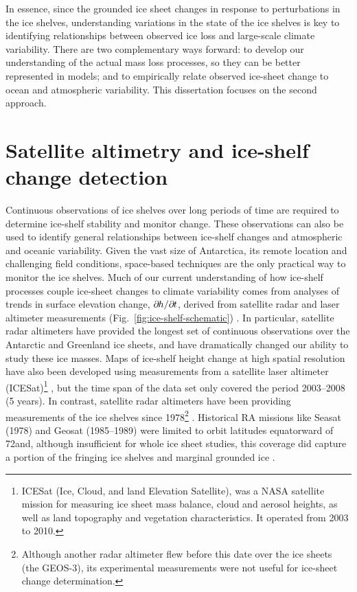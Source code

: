 In essence, since the grounded ice sheet changes in response to perturbations in the ice
shelves, understanding variations in the state of the ice shelves is key to
identifying relationships between observed ice loss and large-scale climate variability.
There are two complementary ways forward: to develop our understanding of the actual mass
loss processes, so they can be better represented in models; and to empirically relate observed
ice-sheet change to ocean and atmospheric variability. This dissertation focuses on the second
approach.

\section{Satellite altimetry and ice-shelf change detection}

Continuous observations of ice shelves over long periods of time are required to determine ice-shelf stability and monitor change. These observations can also be used to identify general relationships between ice-shelf changes and atmospheric and oceanic variability.
Given the vast size of Antarctica, its remote location and challenging field conditions,
space-based techniques are the only practical way to monitor the ice shelves.
Much of our current understanding of how ice-shelf processes couple ice-sheet changes to climate variability comes from analyses of trends in surface elevation change, $\partial\mkern-1.5mu h / \partial\mkern-1.5mu t$, derived from satellite radar and laser altimeter measurements (Fig.~\ref{fig:ice-shelf-schematic}) \parencite{Zwally2005, Shepherd2010, Pritchard2012, Fricker2012}.
In particular, satellite radar altimeters
have provided the longest set of continuous observations over the Antarctic and Greenland ice sheets, and have dramatically changed our ability to study these ice masses. Maps of ice-shelf height change at high spatial resolution have also been developed using measurements from a satellite laser altimeter (ICESat)\footnote{ICESat (Ice, Cloud, and land Elevation Satellite), was a NASA satellite mission for measuring ice sheet mass balance, cloud and aerosol heights, as well as land topography and vegetation characteristics. It operated from 2003 to 2010.} \parencite{Pritchard2012}, but the time span of the data set only covered the period 2003--2008 (5 years). In contrast, satellite radar altimeters have been providing
measurements of the ice shelves since 1978\footnote{Although another radar altimeter flew before
this date over the ice sheets (the GEOS-3), its experimental measurements were not
useful for ice-sheet change determination.} \parencite{Zwally1983, Zwally1989, Davis1998, Martin1983}.
Historical RA missions like Seasat (1978) and Geosat (1985--1989) were limited to orbit latitudes equatorward of 72\degree and, although insufficient for whole ice sheet studies, this coverage did capture a portion of the fringing ice shelves and marginal grounded ice \parencite[e.g.,][]{Fricker2012}.

